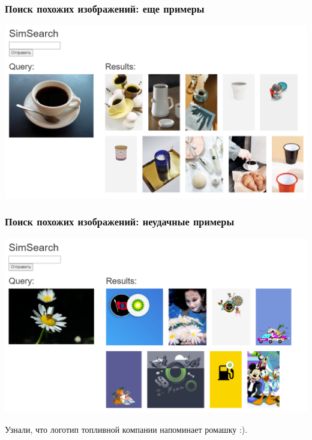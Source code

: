 \documentclass{beamer}
\begin{document}
\begin{frame}
\frametitle{Поиск похожих изображений: еще примеры}


\begin{center}
\includegraphics[width=\linewidth]{simsearch_coffee.png}
\end{center}


\end{frame}

\begin{frame}
\frametitle{Поиск похожих изображений: неудачные примеры}


\begin{center}
\includegraphics[width=\linewidth]{simsearch_daisy.png}
\end{center}

Узнали, что логотип топливной компании напоминает ромашку :).

\end{frame}
\end{document}
